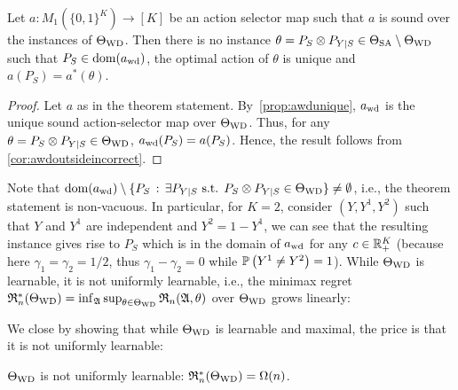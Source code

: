 \begin{thm}
	\label{thm:MaxLearnability}
	Let $a: M_1(\{0,1\}^K) \to [K]$ be an action selector map
	such that $a$ is sound over the instances of $\Theta_{\mathrm{WD}}$.
	Then there is no instance $\theta = P_S\otimes P_{Y|S} \in \Theta_{\mathrm{SA}}\setminus \Theta_{\mathrm{WD}}$ such that 
	$P_S\in \mathrm{dom}(a_{\mathrm{wd}})$, the optimal action of $\theta$ is unique
	and $a(P_S) = a^*(\theta)$.
\end{thm}
\begin{proof}
	Let $a$ as in the theorem statement. By~\cref{prop:awdunique}, $a_{\mathrm{wd}}$ is the unique sound action-selector map over $\Theta_{\mathrm{WD}}$.
	Thus, for any $\theta = P_S\otimes P_{Y|S}\in \Theta_{\mathrm{WD}}$, $a_{\mathrm{wd}}(P_S) = a(P_S)$.
	Hence, the result follows from \cref{cor:awdoutsideincorrect}.
\end{proof}

Note that $\mathrm{dom}(a_{\mathrm{wd}})\setminus \{ P_S \,:\, \exists P_{Y|S} \textrm{ s.t. } P_S \otimes P_{Y|S} \in \Theta_{\mathrm{WD}} \} \ne \emptyset$, i.e., the theorem statement is non-vacuous.
In particular, for $K=2$, consider $(Y,Y^1,Y^2)$ such that $Y$ and $Y^1$ are independent and $Y^2 = 1-Y^1$, we can see that the resulting instance gives rise to $P_S$ which is in the domain of $a_{\mathrm{wd}}$ for any $c\in \mathbb{R}_+^K$ (because here $\gamma_1 = \gamma_2 = 1/2$, thus $\gamma_1 - \gamma_2 = 0$ while $\mathbb{P}\left(Y^1\ne Y^2\right)=1$).
While $\Theta_{\mathrm{WD}}$ is learnable, it is not uniformly learnable, i.e., the minimax regret $\mathfrak{R}_n^*(\Theta_{\mathrm{WD}}) = \inf_{\mathfrak{A}} \sup_{\theta\in \Theta_{\mathrm{WD}}} \mathfrak{R}_n(\mathfrak{A},\theta)$ over $\Theta_{\mathrm{WD}}$ grows linearly:

We close by showing that while $\Theta_{\mathrm{WD}}$ is learnable and maximal, the price is that it is not uniformly learnable:
\begin{thm}
	\label{thm:nonunif}
	$\Theta_{\mathrm{WD}}$ is not uniformly learnable:
	$\mathfrak{R}_n^*(\Theta_{\mathrm{WD}}) = \Omega(n)$.
\end{thm}

